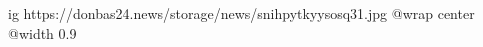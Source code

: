  
 
 
 
 

\ifcmt
  ig https://donbas24.news/storage/news/snihpytkyysosq31.jpg
  @wrap center
  @width 0.9
\fi
